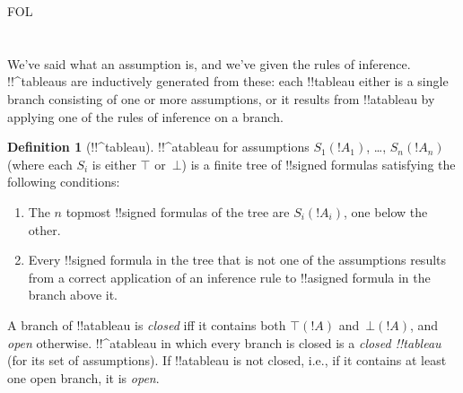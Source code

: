 \documentclass[10pt,a4paper]{article}
\theoremstyle{plain}
\theoremstyle{definition}
\newtheorem{defn}[thm]{Definition}
\theoremstyle{remark}
\newenvironment{explain}{}{}
\newcommand*{\olfileid}[3]{}
\newcommand*{\olsection}[1]{\section*{#1}}
\providecommand{\sFmla}[2]{#1(#2)}
\providecommand{\True}{\top}
\providecommand{\False}{\bot}
\providecommand{\iftag}[1]{#1}
\providecommand{\iftag}{}
\begin{document}



\iftag{FOL}
      {\olfileid{fol}{tab}{der}}
      {\olfileid{pl}{tab}{der}}

\olsection{}

\begin{explain}
We've said what an assumption is, and we've given the rules of
inference.  !!^{tableau}s are inductively generated from these: each
!!{tableau} either is a single branch consisting of one or more
assumptions, or it results from !!a{tableau} by applying one of the
rules of inference on a branch.
\end{explain}

\begin{defn}[!!^{tableau}]
!!^a{tableau} for assumptions $\sFmla{S_1}{!A_1}$, \dots,
$\sFmla{S_n}{!A_n}$ (where each $S_i$ is either $\True$ or~$\False$) is
a finite tree of !!{signed formula}s satisfying the following conditions:
\begin{enumerate}
\item The $n$ topmost !!{signed formula}s of the tree are
  $\sFmla{S_i}{!A_i}$, one below the other.
\item Every !!{signed formula} in the tree that is not one of the
  assumptions results from a correct application of an inference rule
  to !!a{signed formula} in the branch above it.
\end{enumerate}
A branch of !!a{tableau} is \emph{closed} iff it contains both
$\sFmla{\True}{!A}$ and~$\sFmla{\False}{!A}$, and \emph{open}
otherwise. !!^a{tableau} in which every branch is closed is a
\emph{closed !!{tableau}} (for its set of assumptions). If !!a{tableau} is
not closed, i.e., if it contains at least one open branch, it is
\emph{open}.
\end{defn}
\end{document}

